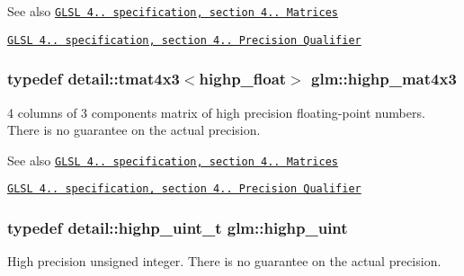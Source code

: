 \begin{DoxySeeAlso}{\-See also}
\href{http://www.opengl.org/registry/doc/GLSLangSpec.4.20.8.pdf}{\tt \-G\-L\-S\-L 4.. specification, section 4.. \-Matrices} 

\href{http://www.opengl.org/registry/doc/GLSLangSpec.4.20.8.pdf}{\tt \-G\-L\-S\-L 4.. specification, section 4.. \-Precision \-Qualifier} 
\end{DoxySeeAlso}
\hypertarget{group__core__precision_ga940a4f42a51d8dee13869ca90aa24df6}{
\subsubsection[{highp\-\_\-mat4x3}]{\setlength{\rightskip}{0pt plus 5cm}typedef detail\-::tmat4x3$<$highp\-\_\-float$>$ {\bf glm\-::highp\-\_\-mat4x3}}}\label{group__core__precision_ga940a4f42a51d8dee13869ca90aa24df6}
4 columns of 3 components matrix of high precision floating-\/point numbers. \-There is no guarantee on the actual precision.

\begin{DoxySeeAlso}{\-See also}
\href{http://www.opengl.org/registry/doc/GLSLangSpec.4.20.8.pdf}{\tt \-G\-L\-S\-L 4.. specification, section 4.. \-Matrices} 

\href{http://www.opengl.org/registry/doc/GLSLangSpec.4.20.8.pdf}{\tt \-G\-L\-S\-L 4.. specification, section 4.. \-Precision \-Qualifier} 
\end{DoxySeeAlso}
\hypertarget{group__core__precision_gabfd1cf11193324a5f77d3831b6ac3205}{
\subsubsection[{highp\-\_\-uint}]{\setlength{\rightskip}{0pt plus 5cm}typedef detail\-::highp\-\_\-uint\-\_\-t {\bf glm\-::highp\-\_\-uint}}}\label{group__core__precision_gabfd1cf11193324a5f77d3831b6ac3205}
\-High precision unsigned integer. \-There is no guarantee on the actual precision.

